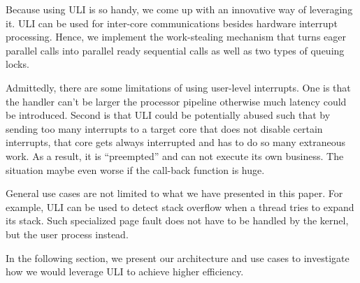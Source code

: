 Because using ULI is so handy, we come up with an innovative way of leveraging it. ULI can be used for inter-core communications besides hardware interrupt processing. Hence, we implement the work-stealing mechanism that turns eager parallel calls into parallel ready sequential calls as well as two types of queuing locks. 

Admittedly, there are some limitations of using user-level interrupts. One is that the handler can't be larger the processor pipeline otherwise much latency could be introduced. Second is that ULI could be potentially abused such that by sending too many interrupts to a target core that does not disable certain interrupts, that core gets always interrupted and has to do so many extraneous work. As a result, it is ``preempted'' and can not execute its own business. The situation maybe even worse if the call-back function is huge.

General use cases are not limited to what we have presented in this paper. For example, ULI can be used to detect stack overflow when a thread tries to expand its stack. Such specialized page fault does not have to be handled by the kernel, but the user process instead. 

In the following section, we present our architecture and use cases to investigate how we would leverage ULI to achieve higher efficiency. 

